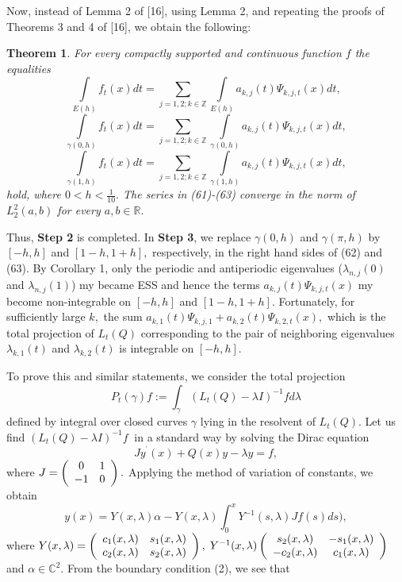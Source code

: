 \documentclass{article}%
\newtheorem{theorem}{Theorem}
{}
\begin{document}
Now, instead of Lemma 2 of [16], using Lemma 2, and repeating the proofs of
Theorems 3 and 4 of [16], we obtain the following:

\begin{theorem}
For every compactly supported and continuous function $f$ the equalities
\begin{equation}
\int\limits_{E(h)}f_{t}(x)dt=\sum\limits_{j=1,2;k\in\mathbb{Z}}\int
\limits_{E(h)}a_{k,j}(t)\Psi_{k,j,t}(x)dt, \tag{61}%
\end{equation}%
\begin{equation}
\int\limits_{\gamma(0,h)}f_{t}(x)dt=\sum\limits_{j=1,2;k\in\mathbb{Z}}%
\int\limits_{\gamma(0,h)}a_{k,j}(t)\Psi_{k,j,t}(x)dt, \tag{62}%
\end{equation}%
\begin{equation}
\int\limits_{\gamma(1,h)}f_{t}(x)dt=\sum\limits_{j=1,2;k\in\mathbb{Z}}%
\int\limits_{\gamma(1,h)}a_{k,j}(t)\Psi_{k,j,t}(x)dt, \tag{63}%
\end{equation}
hold, where $0<h<\frac{1}{10}.$ The series in (61)-(63) converge in the norm
of $L_{2}^{2}(a,b)$ for every $a,b\in\mathbb{R}.$
\end{theorem}

Thus, \textbf{Step 2} is completed. In \textbf{Step 3}, we replace
$\gamma(0,h)$ and $\gamma(\pi,h)$ by $[-h,h]$ and $[1-h,1+h],$ respectively,
in the right hand sides of (62) and (63). By Corollary 1, only the periodic
and antiperiodic eigenvalues ($\lambda_{n,j}(0)$ and $\lambda_{n,j}(1)$) my
became ESS and hence the terms $a_{k,j}(t)\Psi_{k,j,t}(x)$ my become
non-integrable on $[-h,h]$ and $[1-h,1+h].$ Fortunately, for sufficiently
large $k,$ the sum $a_{k,1}(t)\Psi_{k,j,1}+a_{k,2}(t)\Psi_{k,2,t}(x),$ which
is the total projection of $L_{t}(Q)$ corresponding to the pair of neighboring
eigenvalues $\lambda_{k,1}(t)$ and $\lambda_{k,2}(t)$ is integrable on
$[-h,h]$.

To prove this and similar statements, we consider the total projection
\[
P_{t}\left(  \gamma\right)  f:=\int_{\gamma}\left(  L_{t}(Q)-\lambda I\right)
^{-1}fd\lambda
\]
defined by integral over closed curves $\gamma$ lying in the resolvent of
$L_{t}(Q)$. Let us find $\left(  L_{t}(Q)-\lambda I\right)  ^{-1}f$ $\ $in a
standard way by solving the Dirac equation
\[
Jy^{^{\prime}}(x)+Q(x)y-\lambda y=f,
\]
where $J=\left(
\begin{array}
[c]{cc}%
0 & 1\\
-1 & 0
\end{array}
\right)  .$ Applying the method of variation of constants, we obtain%
\[
y(x)=Y(x,\lambda)\alpha-Y(x,\lambda)\int_{0}^{x}Y^{-1}(s,\lambda)Jf(s)ds),
\]
where $Y(x,\lambda)=\left(
\begin{array}
[c]{cc}%
c_{1}(x,\lambda) & s_{1}(x,\lambda)\\
c_{2}(x,\lambda) & s_{2}(x,\lambda)
\end{array}
\right)  ,$ $Y^{-1}(x,\lambda)\left(
\begin{array}
[c]{cc}%
s_{2}(x,\lambda) & -s_{1}(x,\lambda)\\
-c_{2}(x,\lambda) & c_{1}(x,\lambda)
\end{array}
\right)  $ and $\alpha\in\mathbb{C}^{2}.$ From the boundary condition (2), we
see that%
\end{document}
